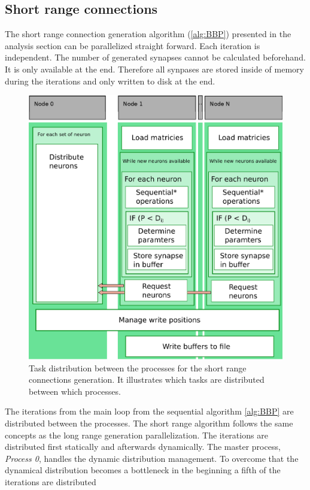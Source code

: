 \subsection{Short range connections}
The short range connection generation algorithm (\ref{alg:BBP}) presented in the analysis section can be parallelized straight forward.
Each iteration is independent. The number of generated synapses cannot be calculated beforehand. It is only available
at the end. Therefore all synpases are stored inside of memory during the iterations and only written to disk 
at the end.
\begin{figure}[ht!]
\centering
\includegraphics[scale=0.5]{pictures/shortRange_parallelAlg.eps}
\caption{Task distribution between the processes for the short range connections generation.
It illustrates which tasks are distributed between which processes.}
\label{fig:shortrangeparallel}
\end{figure}
The iterations from the main loop from the sequential algorithm \ref{alg:BBP} are distributed between the processes.
The short range algorithm follows the same concepts as the long range generation parallelization.
The iterations are distributed first statically and afterwards dynamically.
The master process, \emph{Process 0}, handles the dynamic distribution management.
To overcome that the dynamical distribution becomes a bottleneck in the beginning a fifth of the iterations are distributed
